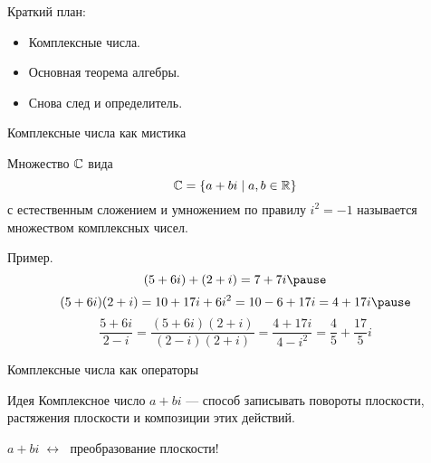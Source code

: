 
\begin{frame} %


\end{frame}



\begin{frame}{Краткий план:}
  \begin{itemize}[<+->] 
    \item Комплексные числа.
    \item Основная теорема алгебры.
    \item Снова след и определитель.
  \end{itemize}

\end{frame}



\begin{frame}{Комплексные числа как мистика}

    \begin{block}{}
        Множество $\mathbb{C}$ вида
        \[
        \mathbb{C} = \{ a+ bi \mid a, b \in \mathbb{R} \}    
        \]
        с естественным сложением и умножением по правилу $i^2 = -1$ называется множеством \alert{комплексных чисел}.
    \end{block}

    \pause
    Пример.
    \[
    (5 + 6i) + (2 + i) = 7 + 7i \pause 
    \]
    \[
        (5 + 6i)(2+i) = 10 + 17i + 6i^2 = 10 - 6 + 17i = 4 + 17i \pause    
    \]
    \[
    \frac{5+6i}{2-i } =     \frac{(5+6i)(2+i)}{(2-i)(2+i)} = \frac{4+17i}{4 - i^2}= \frac{4}{5} + \frac{17}{5}i
    \]

\end{frame}

\begin{frame}{Комплексные числа как операторы}

    \begin{block}{Идея}
    Комплексное число $a + bi$ — способ записывать повороты плоскости,
    растяжения плоскости и композиции этих действий.    
    \end{block}

    \pause
    $a+ bi \; \leftrightarrow \;$ преобразование плоскости! 

\end{frame}


